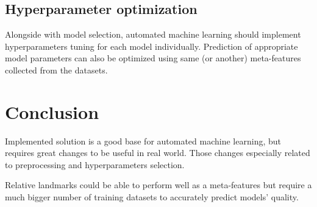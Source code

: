 \documentclass[hidelinks, english]{mvi-report}
\begin{document}
\subsection{Hyperparameter optimization}
Alongside with model selection, automated machine learning should implement hyperparameters tuning for each model
individually. Prediction of appropriate model parameters can also be optimized using same (or another) meta-features
collected from the datasets.

\section{Conclusion}

Implemented solution is a good base for automated machine learning, but requires great changes to be useful in real
world. Those changes especially related to preprocessing and hyperparameters selection.

Relative landmarks could be able to perform well as a meta-features but require a much bigger number of training
datasets to accurately predict models' quality.



\end{document}
